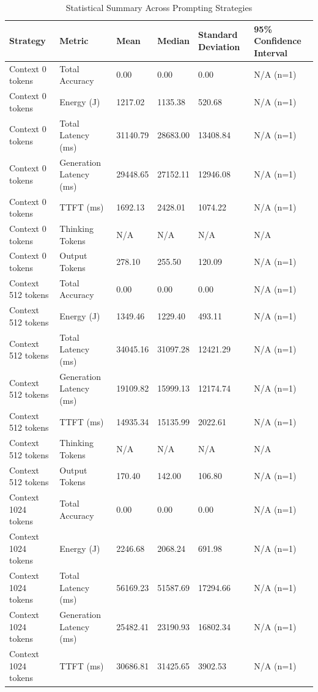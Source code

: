 \begin{table}
\caption{Statistical Summary Across Prompting Strategies}
\label{tab:statistical_summary}
\begin{tabular}{llllll}
\toprule
Strategy & Metric & Mean & Median & Standard Deviation & 95\% Confidence Interval \\
\midrule
Context 0 tokens & Total Accuracy & 0.00 & 0.00 & 0.00 & N/A (n=1) \\
Context 0 tokens & Energy (J) & 1217.02 & 1135.38 & 520.68 & N/A (n=1) \\
Context 0 tokens & Total Latency (ms) & 31140.79 & 28683.00 & 13408.84 & N/A (n=1) \\
Context 0 tokens & Generation Latency (ms) & 29448.65 & 27152.11 & 12946.08 & N/A (n=1) \\
Context 0 tokens & TTFT (ms) & 1692.13 & 2428.01 & 1074.22 & N/A (n=1) \\
Context 0 tokens & Thinking Tokens & N/A & N/A & N/A & N/A \\
Context 0 tokens & Output Tokens & 278.10 & 255.50 & 120.09 & N/A (n=1) \\
Context 512 tokens & Total Accuracy & 0.00 & 0.00 & 0.00 & N/A (n=1) \\
Context 512 tokens & Energy (J) & 1349.46 & 1229.40 & 493.11 & N/A (n=1) \\
Context 512 tokens & Total Latency (ms) & 34045.16 & 31097.28 & 12421.29 & N/A (n=1) \\
Context 512 tokens & Generation Latency (ms) & 19109.82 & 15999.13 & 12174.74 & N/A (n=1) \\
Context 512 tokens & TTFT (ms) & 14935.34 & 15135.99 & 2022.61 & N/A (n=1) \\
Context 512 tokens & Thinking Tokens & N/A & N/A & N/A & N/A \\
Context 512 tokens & Output Tokens & 170.40 & 142.00 & 106.80 & N/A (n=1) \\
Context 1024 tokens & Total Accuracy & 0.00 & 0.00 & 0.00 & N/A (n=1) \\
Context 1024 tokens & Energy (J) & 2246.68 & 2068.24 & 691.98 & N/A (n=1) \\
Context 1024 tokens & Total Latency (ms) & 56169.23 & 51587.69 & 17294.66 & N/A (n=1) \\
Context 1024 tokens & Generation Latency (ms) & 25482.41 & 23190.93 & 16802.34 & N/A (n=1) \\
Context 1024 tokens & TTFT (ms) & 30686.81 & 31425.65 & 3902.53 & N/A (n=1) \\

\end{tabular}
\end{table}
